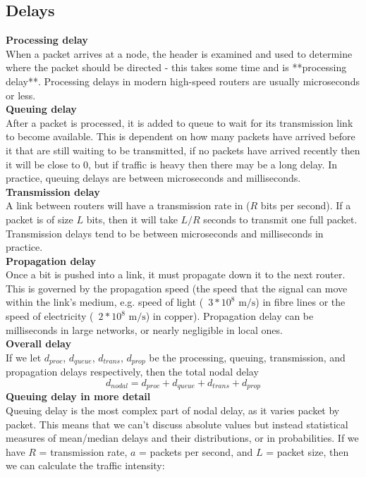 \subsection{Delays}
\textbf{Processing delay}\\
When a packet arrives at a node, the header is examined and used to determine where the packet should be directed - this takes some time and is **processing delay**. Processing delays in modern high-speed routers are usually microseconds or less.\\
\textbf{Queuing delay}\\
After a packet is processed, it is added to queue to wait for its transmission link to become available. This is dependent on how many packets have arrived before it that are still waiting to be transmitted, if no packets have arrived recently then it will be close to 0, but if traffic is heavy then there may be a long delay. In practice, queuing delays are between microseconds and milliseconds.\\
\textbf{Transmission delay}\\
A link between routers will have a transmission rate in ($R$ bits per second). If a packet is of size $L$ bits, then it will take $L/R$ seconds to transmit one full packet. Transmission delays tend to be between microseconds and milliseconds in practice.\\
\textbf{Propagation delay}\\
Once a bit is pushed into a link, it must propagate down it to the next router. This is governed by the propagation speed (the speed that the signal can move within the link's medium, e.g. speed of light (~$3*10^8\text{ m/s}$) in fibre lines or the speed of electricity (~$2*10^8\text{ m/s}$) in copper). Propagation delay can be milliseconds in large networks, or nearly negligible in local ones.\\
\textbf{Overall delay}\\
If we let $d_{proc}$, $d_{queue}$, $d_{trans}$, $d_{prop}$ be the processing, queuing, transmission, and propagation delays respectively, then the total nodal delay
\[
	d_{nodal}=d_{proc}+d_{queue}+d_{trans}+d_{prop}
\]
\textbf{Queuing delay in more detail}\\
Queuing delay is the most complex part of nodal delay, as it varies packet by packet. This means that we can't discuss absolute values but instead statistical measures of mean/median delays and their distributions, or in probabilities.
If we have $R$ = transmission rate, $a$ = packets per second, and $L$ = packet size, then we can calculate the traffic intensity:
